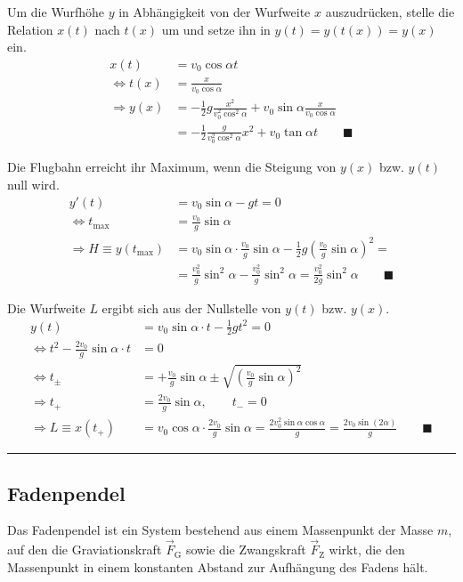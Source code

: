 \documentclass{article}
\newcommand{\lr}[1]{\left(#1\right)}
\begin{document}
{	Um die Wurfhöhe $y$ in Abhängigkeit von der Wurfweite $x$ auszudrücken, stelle die Relation $x(t)$ nach $t(x)$ um und setze ihn in $y(t) = y(t(x)) = y(x)$ ein.
		\begin{align*}
			x(t) &= v_0\cos\alpha t \\
			\Leftrightarrow t(x) &= \frac{x}{v_0\cos\alpha} \\
			\Rightarrow y(x) &= -\frac{1}{2}g \frac{x^2}{v_0^2\cos^2\alpha} + v_0\sin\alpha \frac{x}{v_0\cos\alpha} \\
			&= -\frac{1}{2}\frac{g}{v_0^2\cos^2\alpha} x^2 + v_0\tan\alpha t \qquad\blacksquare
		\end{align*}

	Die Flugbahn erreicht ihr Maximum, wenn die Steigung von $y(x)$ bzw. $y(t)$ null wird.
		\begin{align*}
			y'(t) &= v_0 \sin\alpha - g t = 0 \\
			\Leftrightarrow t_\text{max} &= \frac{v_0}{g}\sin\alpha \\
			\Rightarrow H \equiv y(t_\text{max}) &= v_0\sin\alpha \cdot \frac{v_0}{g}\sin\alpha - \frac{1}{2}g \lr{\frac{v_0}{g}\sin\alpha}^2 = \\
			&= \frac{v_0^2}{g}\sin^2\alpha - \frac{v_0^2}{g}\sin^2\alpha = \frac{v_0^2}{2g}\sin^2\alpha \qquad \blacksquare
		\end{align*}

	Die Wurfweite $L$ ergibt sich aus der Nullstelle von $y(t)$ bzw. $y(x)$.
		\begin{align*}
			y(t) &= v_0 \sin\alpha \cdot t - \frac{1}{2}gt^2 = 0 \\
			\Leftrightarrow t^2 - \frac{2v_0}{g}\sin\alpha \cdot t &= 0 \\
			\Leftrightarrow t_\pm &= +\frac{v_0}{g}\sin\alpha \pm \sqrt{\lr{\frac{v_0}{g}\sin\alpha}^2} \\
			\Rightarrow t_+ &= \frac{2v_0}{g}\sin\alpha,\qquad  t_- = 0 \\
			\Rightarrow L\equiv x(t_+) &= v_0 \cos\alpha \cdot \frac{2v_0}{g}\sin\alpha = \frac{2v_0^2\sin\alpha\cos\alpha}{g} = \frac{2v_0\sin(2\alpha)}{g} \qquad\blacksquare
		\end{align*}
\hrule
}


\newpage


\subsection{Fadenpendel}
Das Fadenpendel ist ein System bestehend aus einem Massenpunkt der Masse $m$, auf den die Graviationskraft $\vec{F}_\text{G}$ sowie die Zwangskraft $\vec{F}_\text{Z}$ wirkt, die den Massenpunkt in einem konstanten Abstand zur Aufhängung des Fadens hält.
\end{document}
